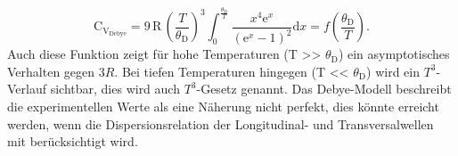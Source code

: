 \begin{equation}
  \text{C}_{\text{V}_\text{Debye}} = 9\,\text{R}\,\left(\frac{T}{\theta_\text{D}}\right)^3 \int_0^{\frac{\theta_\text{D}}{T}} \frac{x^4\text{e}^x}{\left(\text{e}^x - 1\right)^2}\text{d}x = f\left(\frac{\theta_\text{D}}{T}\right).
\end{equation}
Auch diese Funktion zeigt für hohe Temperaturen (T >> $\theta_\text{D}$) ein asymptotisches Verhalten gegen 3$R$.
Bei tiefen Temperaturen hingegen (T << $\theta_\text{D}$) wird ein
$T^3$-Verlauf sichtbar, dies wird auch $T^3$-Gesetz genannt.
Das Debye-Modell beschreibt die experimentellen Werte  als eine Näherung nicht perfekt, dies könnte erreicht werden,
wenn die Dispersionsrelation der Longitudinal- und Transversalwellen mit berücksichtigt wird.
